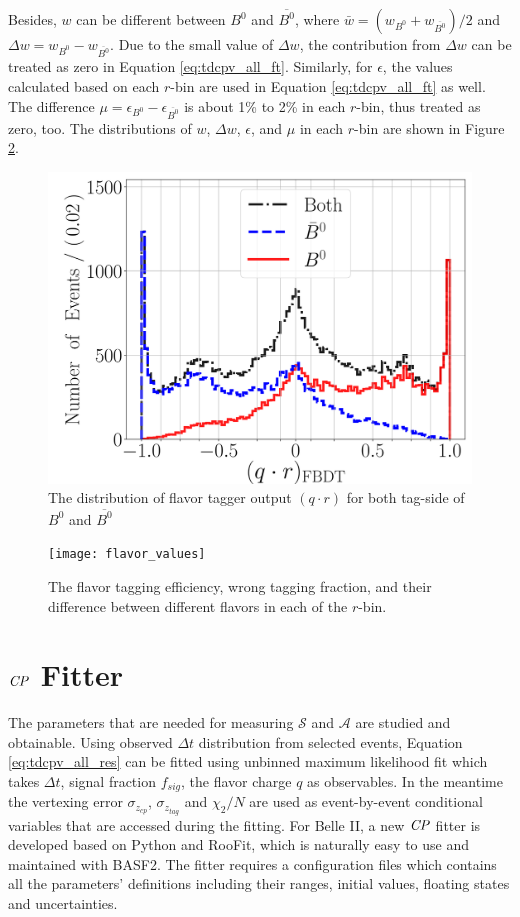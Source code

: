 Besides, $w$ can be different between $B^0$ and $\overline{B^0}$, where
$\bar{w} = (w_{B^0}+w_{\overline{B^0}})/2$ and $\Delta w = w_{B^0}-w_{\overline{B^0}}$. Due to the small value of $\Delta w$, the contribution from $\Delta w$ can be treated as zero in Equation \ref{eq:tdcpv_all_ft}. Similarly, for $\epsilon$, the values calculated based on each $r$-bin are used in Equation \ref{eq:tdcpv_all_ft} as well. The difference $\mu = \epsilon_{B^0}-\epsilon_{\overline{B^0}} $ is about 1\% to 2\% in each $r$-bin, thus treated as zero, too. The distributions of $w$, $\Delta w$, $\epsilon$, and $\mu$ in each $r$-bin are shown in Figure \ref{fig:ft_wtag}.
 \begin{figure}[H]
 	\centering
 	\includegraphics[width=0.7\linewidth]{figures/qr}
 	\caption{The distribution of flavor tagger output $(q\cdot r)$ for both tag-side of $B^0$ and $\overline{B^0}$}
 	\label{fig:ft_qr}
 	\end{figure}
 \begin{figure}[htpb]
 	\texttt{[image: flavor\_values]}
 	\caption{The flavor tagging efficiency, wrong tagging fraction, and their difference between different flavors in each of the $r$-bin.}
 	\label{fig:ft_wtag}
 \end{figure}

\section{$\it{CP}$ Fitter}

The parameters that are needed for measuring $\mathcal{S}$ and $\mathcal{A}$ are studied and obtainable. Using observed $\Delta t$ distribution from selected events, Equation \ref{eq:tdcpv_all_res} can be fitted using unbinned maximum likelihood fit which takes $\Delta t$, signal fraction $f_{sig}$, the flavor charge $q$ as observables. In the meantime the vertexing error $\sigma_{z_{cp}}$, $\sigma_{z_{tag}}$ and $\chi_2/N$ are used as event-by-event conditional variables that are accessed during the fitting.
For Belle II, a new $\it{CP}$ fitter is developed based on Python and RooFit, which is naturally easy to use and maintained with BASF2. The fitter requires a configuration files which contains all the parameters' definitions including their ranges, initial values, floating states and uncertainties. 

